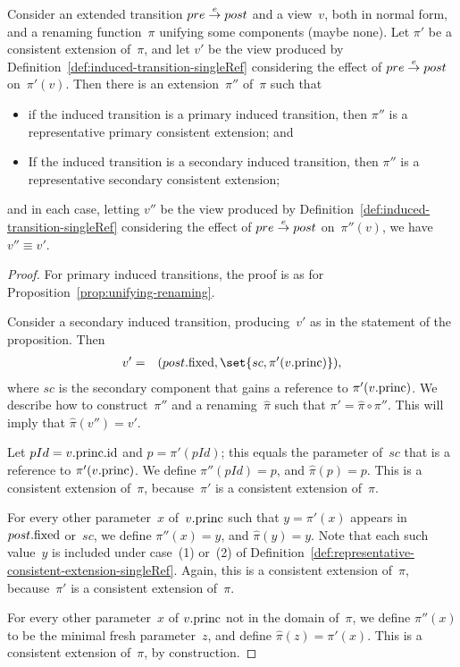 \begin{prop}
Consider an extended transition $pre \stackrel{e}\rightarrow post$ and a view~$v$, both in
normal form, and a renaming function~$\pi$ unifying some components (maybe
none).  Let $\pi'$ be a consistent extension of~$\pi$, and let $v'$ be the
view produced by Definition~\ref{def:induced-transition-singleRef} considering
the effect of $pre \stackrel{e}\rightarrow post$ on~$\pi'(v)$.
%
Then there is an extension~$\pi''$ of~$\pi$ such that
%
\begin{itemize}
\item if the induced transition is a primary induced transition, then $\pi''$
  is a representative primary consistent extension; and

\item If the induced transition is a secondary induced transition, then $\pi''$
  is a representative secondary consistent extension; 
\end{itemize}
and in each case, letting $v''$ be the view produced by
Definition~\ref{def:induced-transition-singleRef} considering the effect of
$pre \stackrel{e}\rightarrow post$ on~$\pi''(v)$, we have $v'' \equiv v'$.
\end{prop}


\begin{proof}
For primary induced transitions, the proof is as for
Proposition~\ref{prop:unifying-renaming}.

Consider a secondary induced transition, producing~$v'$ as in the statement of
the proposition.  Then
%
\begin{eqnarray*}
v' & = & (post.\fixed, \set{sc, \pi'(v.\princ)}),
\end{eqnarray*}
%
where $sc$ is the secondary component that gains a reference to
$\pi'(v.\mathrm{princ})$.  We describe how to construct~$\pi''$ and a
renaming~$\hat\pi$ such that $\pi' = \hat\pi \circ \pi''$.  This will imply
that $\hat\pi(v'') = v'$.

Let $pId = v.\mathrm{princ}.\mathrm{id}$ and $p = \pi'(pId)$; this equals the parameter
of~$sc$ that is a reference to $\pi'(v.\mathrm{princ})$.  We define $\pi''(pId) = p$,
and $\hat\pi(p) = p$.  This is a consistent extension of~$\pi$, because~$\pi'$
is a consistent extension of~$\pi$.

For every other parameter~$x$ of~$v.\mathrm{princ}$ such that $y = \pi'(x)$ appears
in~$post.\mathrm{fixed}$ or~$sc$,  we define $\pi''(x) = y$, and $\hat\pi(y) = y$.
Note that each such value~$y$ is included under case~(1) or~(2) of
Definition~\ref{def:representative-consistent-extension-singleRef}.  Again,
this is a consistent extension of~$\pi$, because~$\pi'$ is a consistent
extension of~$\pi$.

For every other parameter~$x$ of $v.\mathrm{princ}$ not in the domain of~$\pi$, we
define $\pi''(x)$ to be the minimal fresh parameter~$z$, and define
$\hat\pi(z) = \pi'(x)$.  This is a consistent extension of~$\pi$, by
construction.
\end{proof}


